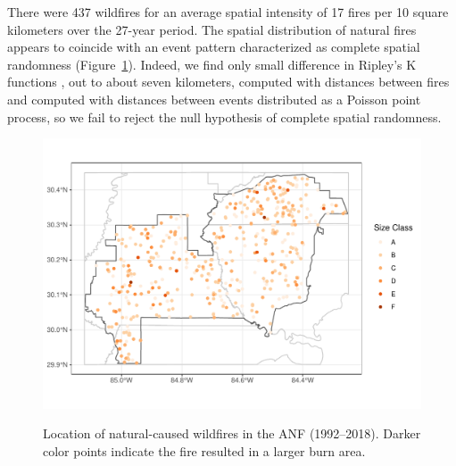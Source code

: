 \documentclass[12pt]{iopart}
\begin{document}
There were 437 wildfires for an average spatial intensity of 17 fires per 10 square kilometers over the 27-year period. The spatial distribution of natural fires appears to coincide with an event pattern characterized as complete spatial randomness (Figure~\ref{WildfireLocations}). Indeed, we find only small difference in Ripley’s K functions \citep{Ripley1976}, out to about seven kilometers, computed with distances between fires and computed with distances between events distributed as a Poisson point process, so we fail to reject the null hypothesis of complete spatial randomness.
\begin{figure}[t]
\noindent\includegraphics[scale=.8,trim=0in 0in 0in 0in,clip]{WildfireLocations.pdf}\\
\vspace{-.5in}
\caption{Location of natural-caused wildfires in the ANF (1992--2018). Darker color points indicate the fire resulted in a larger burn area.}
\label{WildfireLocations}
\end{figure}
\end{document}
